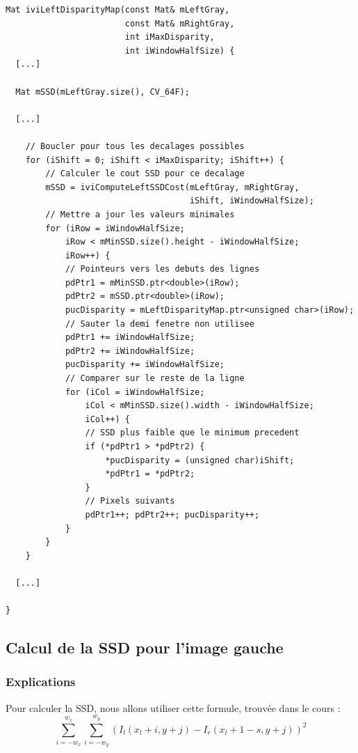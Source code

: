 \documentclass[a4paper]{article}
\begin{document}
\begin{lstlisting}
Mat iviLeftDisparityMap(const Mat& mLeftGray,
                        const Mat& mRightGray,
                        int iMaxDisparity,
                        int iWindowHalfSize) {
  [...]

  Mat mSSD(mLeftGray.size(), CV_64F);

  [...]

    // Boucler pour tous les decalages possibles
    for (iShift = 0; iShift < iMaxDisparity; iShift++) {
        // Calculer le cout SSD pour ce decalage
        mSSD = iviComputeLeftSSDCost(mLeftGray, mRightGray,
                                     iShift, iWindowHalfSize);
        // Mettre a jour les valeurs minimales
        for (iRow = iWindowHalfSize;
            iRow < mMinSSD.size().height - iWindowHalfSize;
            iRow++) {
            // Pointeurs vers les debuts des lignes
            pdPtr1 = mMinSSD.ptr<double>(iRow);
            pdPtr2 = mSSD.ptr<double>(iRow);
            pucDisparity = mLeftDisparityMap.ptr<unsigned char>(iRow);
            // Sauter la demi fenetre non utilisee
            pdPtr1 += iWindowHalfSize;
            pdPtr2 += iWindowHalfSize;
            pucDisparity += iWindowHalfSize;
            // Comparer sur le reste de la ligne
            for (iCol = iWindowHalfSize;
                iCol < mMinSSD.size().width - iWindowHalfSize;
                iCol++) {
                // SSD plus faible que le minimum precedent
                if (*pdPtr1 > *pdPtr2) {
                    *pucDisparity = (unsigned char)iShift;
                    *pdPtr1 = *pdPtr2;
                }
                // Pixels suivants
                pdPtr1++; pdPtr2++; pucDisparity++;
            }
        }
    }

  [...]

}
\end{lstlisting}

\subsection{Calcul de la SSD pour l'image gauche}

\subsubsection{Explications}
Pour calculer la SSD, nous allons utiliser cette formule, trouvée dans le cours :
\begin{equation}
\sum_{i=-w_x}^{w_x} \sum_{i=-w_y}^{w_y} (I_l(x_l+i,y+j)-I_r(x_l+1-s,y+j))^2
\end{equation}
\end{document}
